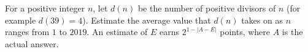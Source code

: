 For a positive integer $n$, let $d\left(n\right)$ be the number of positive divisors of $n$ (for example $d\left(39\right)=4$). Estimate the average value that $d\left(n\right)$ takes on as $n$ ranges from $1$ to $2019$. An estimate of $E$ earns $2^{1-\left|A-E\right|}$ points, where $A$ is the actual answer.